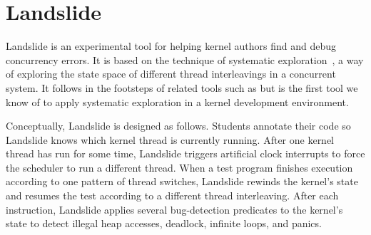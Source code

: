 \newcommand\hilight[2]{\color{#1}#2\color{black}}

\section{Landslide}
\label{sec:landslide}

Landslide is an experimental tool for helping kernel authors find and debug concurrency errors.
It is based on the technique of systematic exploration~\cite{verisoft}, a way of exploring the state space of different thread interleavings in a concurrent system.
It follows in the footsteps of related tools such as
but is the first tool we know of to apply systematic exploration in a kernel development environment.

Conceptually,
Landslide is designed as follows.
Students annotate their code so Landslide knows
which kernel thread is currently running.
After one kernel thread has run for some time,
Landslide triggers artificial clock interrupts
to force the scheduler to run a different thread.
When a test program finishes execution according
to one pattern of thread switches,
Landslide rewinds the kernel's state
and resumes the test according to a different thread interleaving.
After each instruction,
Landslide applies several bug-detection predicates to
the kernel's state to detect
illegal heap accesses,
deadlock, infinite loops, and panics.

